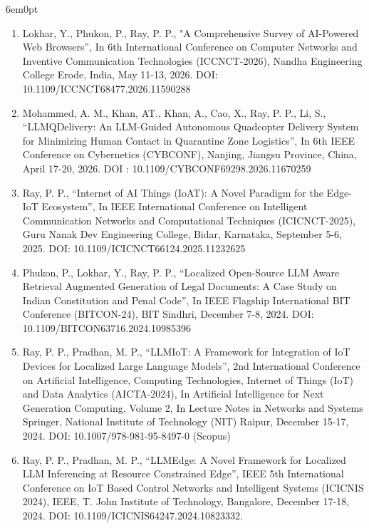 \documentclass[11pt,a4paper]{moderncv}
\begin{document}
\begin{adjustwidth}{6em}{0pt}
	\begin{enumerate}
	
	\item Lokhar, Y., Phukon, P., Ray, P. P., "A Comprehensive Survey of AI-Powered Web Browsers”, In 6th International Conference on Computer Networks and Inventive Communication Technologies (ICCNCT-2026), Nandha Engineering College
	Erode, India, May 11-13, 2026. DOI:  10.1109/ICCNCT68477.2026.11590288
		
	\item Mohammed, A. M., Khan, AT., Khan, A., Cao, X., Ray, P. P., Li, S., “LLMQDelivery: An LLM-Guided Autonomous Quadcopter Delivery System for Minimizing Human Contact in Quarantine Zone Logistics”, In 6th IEEE Conference on Cybernetics (CYBCONF), Nanjing, Jiangsu Province, China, April 17-20, 2026. DOI : 10.1109/CYBCONF69298.2026.11670259
	
	\item 	Ray, P. P., “Internet of AI Things (IoAT): A Novel Paradigm for the Edge-IoT Ecosystem”, In IEEE International Conference on Intelligent Communication Networks and Computational Techniques (ICICNCT-2025), Guru Nanak Dev Engineering College, Bidar, Karnataka, September 5-6, 2025. DOI: 10.1109/ICICNCT66124.2025.11232625

	\item Phukon, P., Lokhar, Y., Ray, P. P., “Localized Open-Source LLM Aware Retrieval Augmented Generation of Legal Documents: A Case Study on Indian Constitution and Penal Code”, In IEEE Flagship International BIT Conference (BITCON-24), BIT Sindhri, December 7-8, 2024. DOI: 10.1109/BITCON63716.2024.10985396 
	
	\item Ray, P. P., Pradhan, M. P., “LLMIoT: A Framework for Integration of IoT Devices for Localized Large Language Models”, 2nd International Conference on Artificial Intelligence, Computing Technologies, Internet of Things (IoT) and Data Analytics (AICTA-2024), In Artificial Intelligence for Next Generation Computing, Volume 2, In Lecture Notes in Networks and Systems Springer, National Institute of Technology (NIT) Raipur, December 15-17, 2024. DOI: 10.1007/978-981-95-8497-0 (Scopus)
	
	\item Ray, P. P., Pradhan, M. P., “LLMEdge: A Novel Framework for Localized LLM Inferencing at Resource Constrained Edge”, IEEE 5th International Conference on IoT Based Control Networks and Intelligent Systems (ICICNIS 2024), IEEE, T. John Institute of Technology, Bangalore, December 17-18, 2024. DOI: 10.1109/ICICNIS64247.2024.10823332.
	

\end{enumerate}
\end{adjustwidth}
\end{document}
